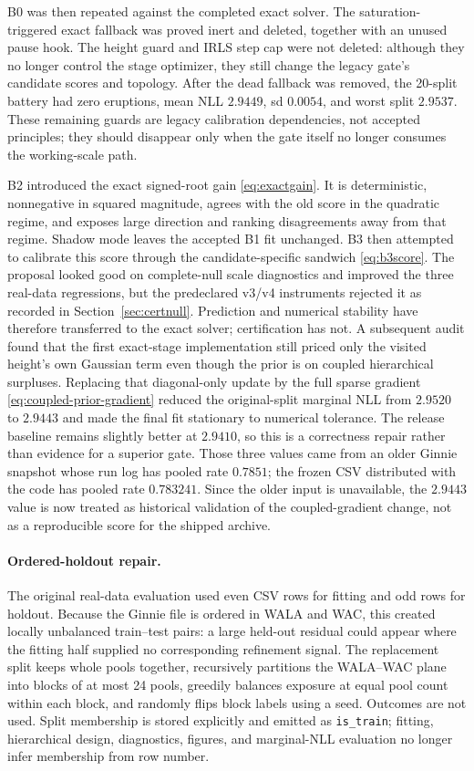 \documentclass[11pt]{article}
\begin{document}
B0 was then repeated against the completed exact solver. The saturation-triggered exact fallback was
proved inert and deleted, together with an unused pause hook. The height guard and IRLS step cap were
not deleted: although they no longer control the stage optimizer, they still change the legacy gate's
candidate scores and topology. After the dead fallback was removed, the 20-split battery had zero
eruptions, mean NLL $2.9449$, sd $0.0054$, and worst split $2.9537$. These remaining guards are
legacy calibration dependencies, not accepted principles; they should disappear only when the gate
itself no longer consumes the working-scale path.

B2 introduced the exact signed-root gain \eqref{eq:exactgain}. It is deterministic, nonnegative in
squared magnitude, agrees with the old score in the quadratic regime, and exposes large direction and
ranking disagreements away from that regime. Shadow mode leaves the accepted B1 fit unchanged. B3
then attempted to calibrate this score through the candidate-specific sandwich
\eqref{eq:b3score}. The proposal looked good on complete-null scale diagnostics and improved the
three real-data regressions, but the predeclared v3/v4 instruments rejected it as recorded in
Section~\ref{sec:certnull}. Prediction and numerical stability have therefore transferred to the
exact solver; certification has not. A subsequent audit found that the first exact-stage
implementation still priced only the visited height's own Gaussian term even though the prior is on
coupled hierarchical surpluses. Replacing that diagonal-only update by the full sparse gradient
\eqref{eq:coupled-prior-gradient} reduced the original-split marginal NLL from $2.9520$ to $2.9443$
and made the final fit stationary to numerical tolerance. The release baseline remains slightly
better at $2.9410$, so this is a correctness repair rather than evidence for a superior gate. Those
three values came from an older Ginnie snapshot whose run log has pooled rate $0.7851$; the frozen
CSV distributed with the code has pooled rate $0.783241$. Since the older input is unavailable, the
$2.9443$ value is now treated as historical validation of the coupled-gradient change, not as a
reproducible score for the shipped archive.

\paragraph{Ordered-holdout repair.}
The original real-data evaluation used even CSV rows for fitting and odd rows for holdout. Because
the Ginnie file is ordered in WALA and WAC, this created locally unbalanced train--test pairs: a large
held-out residual could appear where the fitting half supplied no corresponding refinement signal.
The replacement split keeps whole pools together, recursively partitions the WALA--WAC plane into
blocks of at most 24 pools, greedily balances exposure at equal pool count within each block, and
randomly flips block labels using a seed. Outcomes are not used. Split membership is stored explicitly
and emitted as \texttt{is\_train}; fitting, hierarchical design, diagnostics, figures, and marginal-NLL
evaluation no longer infer membership from row number.
\end{document}
